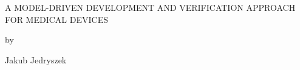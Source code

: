\begin{center}

   \vspace{1cm}


  \large A MODEL-DRIVEN DEVELOPMENT AND VERIFICATION APPROACH FOR MEDICAL DEVICES\\


   \vspace{0.3cm}

   by\\

   \vspace{0.3cm}


   \large Jakub Jedryszek\\

   \vspace{0.3cm}


\end{center}
